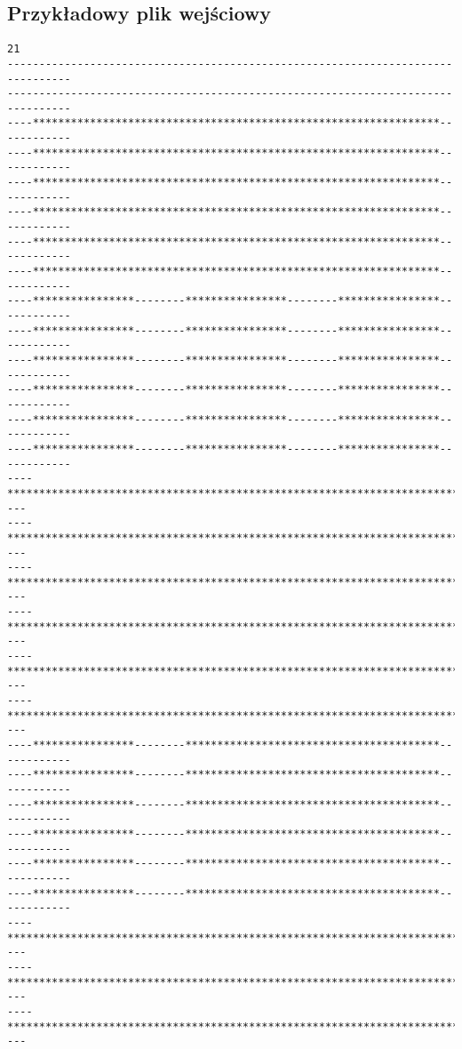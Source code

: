 \documentclass[a4paper]{article}
\begin{document}
\subsection*{Przykładowy plik wejściowy}
\begin{verbatim}
21
--------------------------------------------------------------------------------
--------------------------------------------------------------------------------
----****************************************************************------------
----****************************************************************------------
----****************************************************************------------
----****************************************************************------------
----****************************************************************------------
----****************************************************************------------
----****************--------****************--------****************------------
----****************--------****************--------****************------------
----****************--------****************--------****************------------
----****************--------****************--------****************------------
----****************--------****************--------****************------------
----****************--------****************--------****************------------
----************************************************************************----
----************************************************************************----
----************************************************************************----
----************************************************************************----
----************************************************************************----
----************************************************************************----
----****************--------****************************************------------
----****************--------****************************************------------
----****************--------****************************************------------
----****************--------****************************************------------
----****************--------****************************************------------
----****************--------****************************************------------
----************************************************************************----
----************************************************************************----
----************************************************************************----

\end{verbatim}
\end{document}
